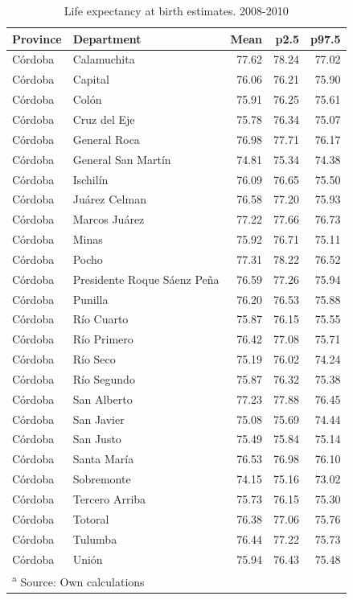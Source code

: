 \documentclass[12pt,]{article}
\begin{document}
\begin{table}

\caption{\label{tab:table_e0}Life expectancy at birth estimates. 2008-2010}
\centering
\begin{tabular}[t]{l|l|r|r|r}
\hline
Province & Department & Mean & p2.5 & p97.5\\
\hline
Córdoba & Calamuchita & 77.62 & 78.24 & 77.02\\
\hline
Córdoba & Capital & 76.06 & 76.21 & 75.90\\
\hline
Córdoba & Colón & 75.91 & 76.25 & 75.61\\
\hline
Córdoba & Cruz del Eje & 75.78 & 76.34 & 75.07\\
\hline
Córdoba & General Roca & 76.98 & 77.71 & 76.17\\
\hline
Córdoba & General San Martín & 74.81 & 75.34 & 74.38\\
\hline
Córdoba & Ischilín & 76.09 & 76.65 & 75.50\\
\hline
Córdoba & Juárez Celman & 76.58 & 77.20 & 75.93\\
\hline
Córdoba & Marcos Juárez & 77.22 & 77.66 & 76.73\\
\hline
Córdoba & Minas & 75.92 & 76.71 & 75.11\\
\hline
Córdoba & Pocho & 77.31 & 78.22 & 76.52\\
\hline
Córdoba & Presidente Roque Sáenz Peña & 76.59 & 77.26 & 75.94\\
\hline
Córdoba & Punilla & 76.20 & 76.53 & 75.88\\
\hline
Córdoba & Río Cuarto & 75.87 & 76.15 & 75.55\\
\hline
Córdoba & Río Primero & 76.42 & 77.08 & 75.71\\
\hline
Córdoba & Río Seco & 75.19 & 76.02 & 74.24\\
\hline
Córdoba & Río Segundo & 75.87 & 76.32 & 75.38\\
\hline
Córdoba & San Alberto & 77.23 & 77.88 & 76.45\\
\hline
Córdoba & San Javier & 75.08 & 75.69 & 74.44\\
\hline
Córdoba & San Justo & 75.49 & 75.84 & 75.14\\
\hline
Córdoba & Santa María & 76.53 & 76.98 & 76.10\\
\hline
Córdoba & Sobremonte & 74.15 & 75.16 & 73.02\\
\hline
Córdoba & Tercero Arriba & 75.73 & 76.15 & 75.30\\
\hline
Córdoba & Totoral & 76.38 & 77.06 & 75.76\\
\hline
Córdoba & Tulumba & 76.44 & 77.22 & 75.73\\
\hline
Córdoba & Unión & 75.94 & 76.43 & 75.48\\
\hline
\multicolumn{5}{l}{\textsuperscript{a} Source: Own calculations}\\
\end{tabular}
\end{table}
\end{document}
